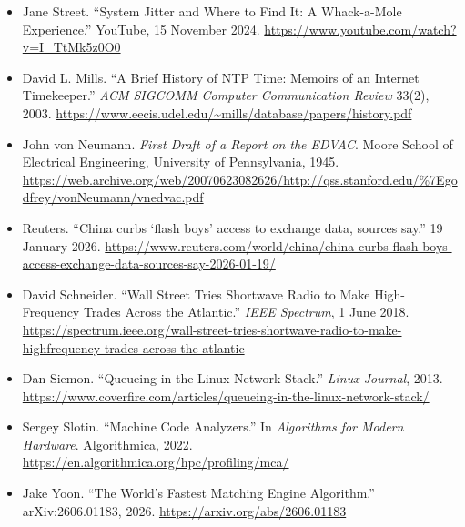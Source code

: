 \documentclass{article}
\begin{document}
\begin{itemize}
	\item Jane Street. ``System Jitter and Where to Find It: A Whack-a-Mole Experience.'' YouTube, 15 November 2024. \url{https://www.youtube.com/watch?v=I_TtMk5z0O0}
	\item David L. Mills. ``A Brief History of NTP Time: Memoirs of an Internet Timekeeper.'' \textit{ACM SIGCOMM Computer Communication Review} 33(2), 2003. \url{https://www.eecis.udel.edu/~mills/database/papers/history.pdf}
	\item John von Neumann. \textit{First Draft of a Report on the EDVAC}. Moore School of Electrical Engineering, University of Pennsylvania, 1945. \url{https://web.archive.org/web/20070623082626/http://qss.stanford.edu/%7Egodfrey/vonNeumann/vnedvac.pdf}
	\item Reuters. ``China curbs `flash boys' access to exchange data, sources say.'' 19 January 2026. \url{https://www.reuters.com/world/china/china-curbs-flash-boys-access-exchange-data-sources-say-2026-01-19/}
	\item David Schneider. ``Wall Street Tries Shortwave Radio to Make High-Frequency Trades Across the Atlantic.'' \textit{IEEE Spectrum}, 1 June 2018. \url{https://spectrum.ieee.org/wall-street-tries-shortwave-radio-to-make-highfrequency-trades-across-the-atlantic}
	\item Dan Siemon. ``Queueing in the Linux Network Stack.'' \textit{Linux Journal}, 2013. \url{https://www.coverfire.com/articles/queueing-in-the-linux-network-stack/}
	\item Sergey Slotin. ``Machine Code Analyzers.'' In \textit{Algorithms for Modern Hardware}. Algorithmica, 2022. \url{https://en.algorithmica.org/hpc/profiling/mca/}
	\item Jake Yoon. ``The World's Fastest Matching Engine Algorithm.'' arXiv:2606.01183, 2026. \url{https://arxiv.org/abs/2606.01183}
\end{itemize}
\end{document}
